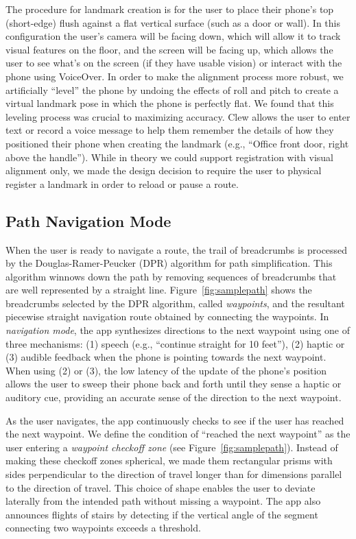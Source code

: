 \documentclass[chi_draft]{sigchi}
\begin{document}
The procedure for landmark creation is for the user to place their phone's top (short-edge) flush against a flat vertical surface (such as a door or wall).  In this configuration the user's camera will be facing down, which will allow it to track visual features on the floor, and the screen will be facing up, which allows the user to see what's on the screen (if they have usable vision) or interact with the phone using VoiceOver.  In order to make the alignment process more robust, we artificially ``level'' the phone by undoing the effects of roll and pitch to create a virtual landmark pose in which the phone is perfectly flat.  We found that this leveling process was crucial to maximizing accuracy.  Clew allows the user to enter text or record a voice message to help them remember the details of how they positioned their phone when creating the landmark (e.g., ``Office front door, right above the handle'').  While in theory we could support registration with visual alignment only, we made the design decision to require the user to physical register a landmark in order to reload or pause a route.

\subsection{Path Navigation Mode}\label{sec:pathnavigationmode}

When the user is ready to navigate a route, the trail of breadcrumbs is processed by the Douglas-Ramer-Peucker (DPR) algorithm \cite{douglas1973algorithms} for path simplification.  This algorithm winnows down the path by removing sequences of breadcrumbs that are well represented by a straight line.  Figure~\ref{fig:samplepath} shows the breadcrumbs selected by the DPR algorithm, called \emph{waypoints}, and the resultant piecewise straight navigation route obtained by connecting the waypoints.  In \emph{navigation mode}, the app synthesizes directions to the next waypoint using one of three mechanisms: (1) speech (e.g., ``continue straight for 10 feet''), (2) haptic or (3) audible feedback when the phone is pointing towards the next waypoint.  When using (2) or (3), the low latency of the update of the phone's position allows the user to sweep their phone back and forth until they sense a haptic or auditory cue, providing an accurate sense of the direction to the next waypoint.

As the user navigates, the app continuously checks to see if the user has reached the next waypoint.  We define the condition of ``reached the next waypoint'' as the user entering a \emph{waypoint checkoff zone} (see Figure~\ref{fig:samplepath}).  Instead of making these checkoff zones spherical, we made them rectangular prisms with sides perpendicular to the direction of travel longer than for dimensions parallel to the direction of travel.  This choice of shape enables the user to deviate laterally from the intended path without missing a waypoint.  The app also announces flights of stairs by detecting if the vertical angle of the segment connecting two waypoints exceeds a threshold.
\end{document}
